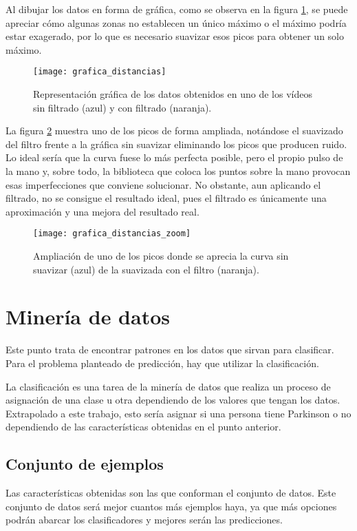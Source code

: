Al dibujar los datos en forma de gráfica, como se observa en la figura \ref{fig:graficadistancias}, se puede apreciar cómo algunas zonas no establecen un único máximo o el máximo podría estar exagerado, por lo que es necesario suavizar esos picos para obtener un solo máximo. 

\begin{figure}[h]
	\texttt{[image: grafica\_distancias]}
	\centering
	\caption[Representación gráfica de los datos obtenidos en uno de los vídeos con y sin filtrado.]{Representación gráfica de los datos obtenidos en uno de los vídeos sin filtrado (azul) y con filtrado (naranja).}
	\label{fig:graficadistancias}
\end{figure}

La figura \ref{fig:graficadistanciaszoom} muestra uno de los picos de forma ampliada, notándose el suavizado del filtro frente a la gráfica sin suavizar eliminando los picos que producen ruido. Lo ideal sería que la curva fuese lo más perfecta posible, pero el propio pulso de la mano y, sobre todo, la biblioteca que coloca los puntos sobre la mano provocan esas imperfecciones que conviene solucionar. No obstante, aun aplicando el filtrado, no se consigue el resultado ideal, pues el filtrado es únicamente una aproximación y una mejora del resultado real.

\begin{figure}[h]
	\texttt{[image: grafica\_distancias\_zoom]}
	\caption[Ampliación de uno de los picos donde se aprecia la curva con y sin suavizado.]{Ampliación de uno de los picos donde se aprecia la curva sin suavizar (azul) de la suavizada con el filtro (naranja).}
	\label{fig:graficadistanciaszoom}
\end{figure}

\section{Minería de datos}
Este punto trata de encontrar patrones en los datos que sirvan para clasificar. Para el problema planteado de predicción, hay que utilizar la clasificación.

La clasificación es una tarea de la minería de datos que realiza un proceso de asignación de una clase u otra dependiendo de los valores que tengan los datos. Extrapolado a este trabajo, esto sería asignar si una persona tiene Parkinson o no dependiendo de las características obtenidas en el punto anterior.

\subsection{Conjunto de ejemplos}
Las características obtenidas son las que conforman el conjunto de datos. Este conjunto de datos será mejor cuantos más ejemplos haya, ya que más opciones podrán abarcar los clasificadores y mejores serán las predicciones.

